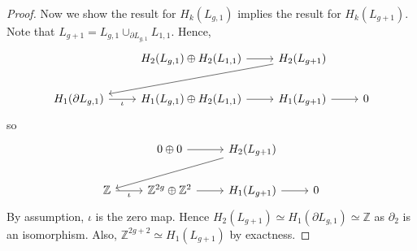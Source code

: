\begin{proof}
	Now we show the result for \( H_k(L_{g,1}) \) implies the result for \( H_k(L_{g+1}) \).
	Note that \( L_{g+1} = L_{g,1} \cup_{\partial L_{g,1}} L_{1,1} \).
	Hence,
	\[\begin{tikzcd}
		& {H_2(L_{g,1}) \oplus H_2(L_{1,1})} & {H_2(L_{g+1})} \\
		{H_1(\partial L_{g,1})} & {H_1(L_{g,1}) \oplus H_2(L_{1,1})} & {H_1(L_{g+1})} & 0
		\arrow[from=1-2, to=1-3]
		\arrow[from=1-3, to=2-1]
		\arrow["{\iota}"', from=2-1, to=2-2]
		\arrow[from=2-2, to=2-3]
		\arrow[from=2-3, to=2-4]
	\end{tikzcd}\]
	so
	\[\begin{tikzcd}
		& {0 \oplus 0} & {H_2(L_{g+1})} \\
		{\mathbb Z} & {\mathbb Z^{2g} \oplus \mathbb Z^2} & {H_1(L_{g+1})} & 0
		\arrow[from=1-2, to=1-3]
		\arrow[from=1-3, to=2-1]
		\arrow["{\iota}"', from=2-1, to=2-2]
		\arrow[from=2-2, to=2-3]
		\arrow[from=2-3, to=2-4]
	\end{tikzcd}\]
	By assumption, \( \iota \) is the zero map.
	Hence \( H_2(L_{g+1}) \simeq H_1(\partial L_{g,1}) \simeq \mathbb Z \) as \( \partial_2 \) is an isomorphism.
	Also, \( \mathbb Z^{2g+2} \simeq H_1(L_{g+1}) \) by exactness.
\end{proof}

